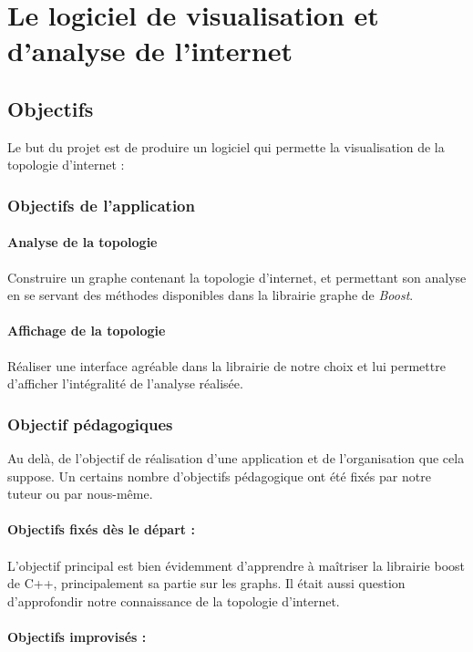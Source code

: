 \section{Le logiciel de visualisation et d'analyse de l'internet}
\subsection{Objectifs}
Le but du projet est de produire un logiciel qui permette la visualisation de la topologie d'internet :
\subsubsection{Objectifs de l'application}
\label{obj}
\paragraph{Analyse de la topologie}
Construire un graphe contenant la topologie d'internet, et permettant son analyse en se servant des méthodes disponibles dans la librairie graphe de \textit{Boost}.

\paragraph{Affichage de la topologie}
Réaliser une interface agréable dans la librairie de notre choix et lui permettre d'afficher l'intégralité de l'analyse réalisée.

\subsubsection{Objectif pédagogiques}
Au delà, de l'objectif de réalisation d'une application et de l'organisation que cela suppose. Un certains nombre d'objectifs pédagogique ont été fixés par notre tuteur ou par nous-même.

\paragraph{Objectifs fixés dès le départ : } 
\paragraph{}L'objectif principal est bien évidemment d'apprendre à maîtriser la librairie boost de C++, principalement sa partie sur les graphs. Il était aussi question d'approfondir notre connaissance de la topologie d'internet.

\paragraph{Objectifs improvisés : }

